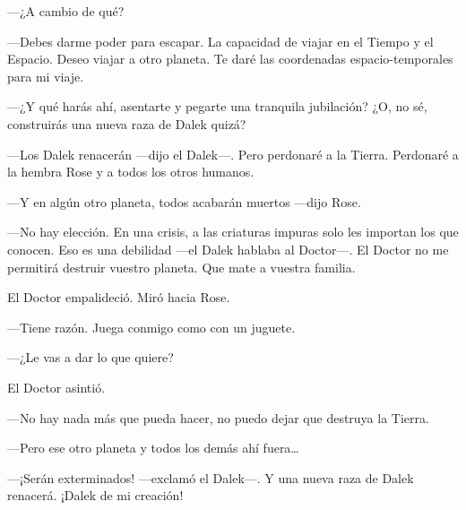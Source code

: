 ---¿A cambio de qué?

---Debes darme poder para escapar. La capacidad de viajar en el Tiempo y
el Espacio. Deseo viajar a otro planeta. Te daré las coordenadas
espacio-temporales para mi viaje.

---¿Y qué harás ahí, asentarte y pegarte una tranquila jubilación? ¿O,
no sé, construirás una nueva raza de Dalek quizá?

---Los Dalek renacerán ---dijo el Dalek---. Pero perdonaré a la Tierra.
Perdonaré a la hembra Rose y a todos los otros humanos.

---Y en algún otro planeta, todos acabarán muertos ---dijo Rose.

---No hay elección. En una crisis, a las criaturas impuras solo les
importan los que conocen. Eso es una debilidad ---el Dalek hablaba al
Doctor---. El Doctor no me permitirá destruir vuestro planeta. Que mate a
vuestra familia.

El Doctor empalideció. Miró hacia Rose.

---Tiene razón. Juega conmigo como con un juguete.

---¿Le vas a dar lo que quiere?

El Doctor asintió.

---No hay nada más que pueda hacer, no puedo dejar que destruya la
Tierra.

---Pero ese otro planeta y todos los demás ahí fuera\ldots{}

---¡Serán exterminados! ---exclamó el Dalek---. Y una nueva raza de Dalek
renacerá. ¡Dalek de mi creación!